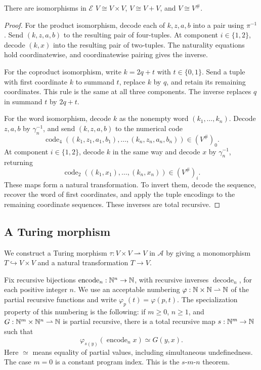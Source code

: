 \begin{lemma}\label{lem:fork-frames}
There are isomorphisms in $\mathcal E$
$V\cong V\times V$, $V\cong V+V$, and $V\cong V^\#$.
\end{lemma}
\begin{proof}
For the product isomorphism, decode each of $k,z,a,b$ into a
pair using $\pi^{-1}$. Send $(k,z,a,b)$ to the resulting pair
of four-tuples. At component $i\in\{1,2\}$, decode $(k,x)$ into
the resulting pair of two-tuples. The naturality equations hold
coordinatewise, and coordinatewise pairing gives the inverse.

For the coproduct isomorphism, write $k=2q+t$ with
$t\in\{0,1\}$. Send a tuple with first coordinate $k$ to
summand $t$, replace $k$ by $q$, and retain its remaining
coordinates. This rule is the same at all three components.
The inverse replaces $q$ in summand $t$ by $2q+t$.

For the word isomorphism, decode $k$ as the nonempty word
$(k_1,\ldots,k_n)$. Decode $z,a,b$ by $\gamma_n^{-1}$,
and send $(k,z,a,b)$ to the numerical code
\[
 \operatorname{code}_4
 ((k_1,z_1,a_1,b_1),\ldots,(k_n,z_n,a_n,b_n))
 \in(V^\#)_0.
\]
At component $i\in\{1,2\}$, decode $k$ in the same way and
decode $x$ by $\gamma_n^{-1}$, returning
\[
 \operatorname{code}_2((k_1,x_1),\ldots,(k_n,x_n))\in(V^\#)_i.
\]
These maps form a natural transformation. To invert them, decode
the sequence, recover the word of first coordinates, and apply
the tuple encodings to the remaining coordinate sequences.
These inverses are total recursive.
\end{proof}

\subsection{A Turing morphism}\label{app:fork-turing}

We construct a Turing morphism $\tau:V\times V\rightharpoonup V$
in $\mathcal A$ by giving a monomorphism $T\hookrightarrow V\times V$
and a natural transformation $T\to V$.

Fix recursive bijections
$\operatorname{encode}_n:\mathbb N^n\to\mathbb N$, with recursive inverses
$\operatorname{decode}_n$, for each positive integer $n$.
We use an acceptable numbering
$\varphi:\mathbb N\times\mathbb N\rightharpoonup\mathbb N$ of the partial recursive
functions and write $\varphi_p(t)=\varphi(p,t)$.
The specialization property of this numbering is the following:
if $m\geq0$, $n\geq1$, and
$G:\mathbb N^m\times\mathbb N^n\rightharpoonup\mathbb N$ is partial recursive,
there is a total recursive map $s:\mathbb N^m\to\mathbb N$ such that
\[
 \varphi_{s(y)}(\operatorname{encode}_n x)\simeq G(y,x).
\]
Here $\simeq$ means equality of partial values,
including simultaneous undefinedness. The case $m=0$ is a
constant program index. This is the $s$-$m$-$n$ theorem.

